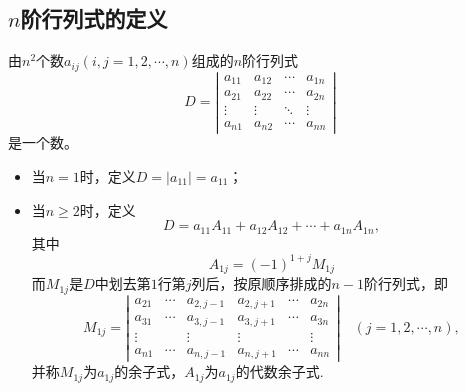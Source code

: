 \subsection{$n$阶行列式的定义}
\begin{dingyi}[$n$阶行列式]
  由$n^2$个数$a_{ij}(i,j=1,2,\cdots,n)$组成的$n$阶行列式
  \begin{equation}\label{Dn}
    D = \left|
      \begin{array}{cccc}
        a_{11}  &  a_{12} & \cdots & a_{1n} \\
        a_{21}  &  a_{22} & \cdots & a_{2n} \\
        \vdots & \vdots & \ddots & \vdots\\  
        a_{n1}  &  a_{n2} & \cdots & a_{nn} 
      \end{array}
    \right|
  \end{equation}
  是一个数。
  \begin{itemize}
  \item 当$n=1$时，定义$D=|a_{11}|=a_{11}$； 
  \item 当$n\ge2$时，定义
    \begin{equation}
      D = a_{11} A_{11} + a_{12} A_{12} + \cdots + a_{1n} A_{1n},
    \end{equation}
    其中
    $$A_{1j} = (-1)^{1+j} M_{1j}$$
    而$M_{1j}$是$D$中划去第$1$行第$j$列后，按原顺序排成的$n-1$阶行列式，即
    $$
    M_{1j} =   \left|
      \begin{array}{cccccc}
        a_{21}  & \cdots&  a_{2,j-1}  &  a_{2,j+1}  & \cdots & a_{2n} \\
        a_{31}  & \cdots&  a_{3,j-1}  &  a_{3,j+1}  & \cdots & a_{3n} \\
        \vdots &       &  \vdots &  \vdots &  & \vdots\\  
        a_{n1}  & \cdots&  a_{n,j-1}  &  a_{n,j+1}  & \cdots & a_{nn} 
      \end{array}
    \right| \quad (j = 1,2,\cdots, n),
    $$
    并称$M_{1j}$为$a_{1j}$的余子式，$A_{1j}$为$a_{1j}$的代数余子式.
  \end{itemize}
\end{dingyi}

